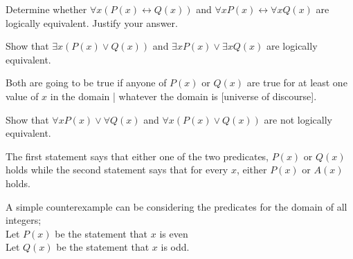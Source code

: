 \documentclass[addpoints]{exam}
\newenvironment{problem}[2][Problem]{\begin{trivlist}
    \item[\hskip \labelsep {\bfseries #1}\hskip \labelsep {\bfseries #2.}]}{\end{trivlist}}
\begin{document}
\begin{sloppypar}
\begin{questions}
    \question
    \begin{solution}

    \end{solution}
\end{questions}

\begin{problem}{10}
Determine whether $\forall x (P(x) \leftrightarrow Q(x))$ and $\forall x P(x) \leftrightarrow \forall x Q(x)$ are logically equivalent. Justify your answer.
\end{problem}

\begin{questions}
    \question
    \begin{solution}
        
    \end{solution}
\end{questions}

\begin{problem}{11}
Show that  $\exists x (P(x) \lor Q(x))$ and $\exists x P(x) \lor \exists x Q(x)$ are logically equivalent.
\end{problem}

\begin{questions}
    \question
    \begin{solution}

        Both are going to be true if anyone of $ P(x) $ or $ Q(x) $ are true for at least one value of $x$ in the domain | whatever the domain is [universe of discourse].
    \end{solution}
\end{questions}
\pagebreak
\begin{problem}{12}
Show that  $\forall x P(x) \lor \forall Q(x)$ and $\forall x (P(x) \lor Q(x))$ are not logically equivalent.
\end{problem}

\begin{questions}
    \question
    \begin{solution}

        The first statement says that either one of the two predicates, $ P(x) $ or $ Q(x) $ holds while the second statement says that for every $x$, either $ P(x) $ or $ A(x) $ holds. 

        A simple counterexample can be considering the predicates for the domain of all integers; \\ Let $ P(x) $ be the statement that $x$ is even \\ Let $ Q(x) $ be the statement that $x$ is odd. 
        

\end{solution}
\end{questions}
\end{sloppypar}
\end{document}
